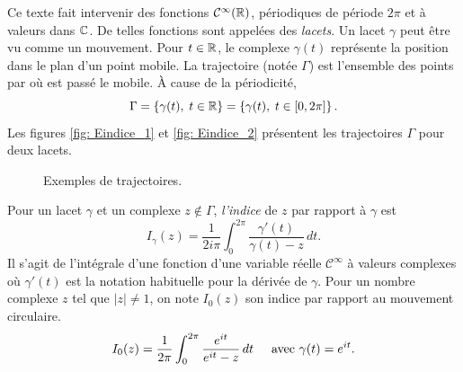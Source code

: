 Ce texte fait intervenir des fonctions $\mathcal{C}^{\infty}(\mathbb{R})$, périodiques de période $2\pi$ et à valeurs dans $\mathbb{C}$. De telles fonctions sont appelées des \emph{lacets}. Un lacet $\gamma$ peut être vu comme un mouvement. Pour $t\in \mathbb{R}$, le complexe $\gamma(t)$ représente la position dans le plan d'un point mobile. La trajectoire (notée $\Gamma$) est l'ensemble des points par où est passé le mobile. \`A cause de la périodicité,
\[
 \Gamma = \left\lbrace \gamma(t), \; t\in \mathbb{R} \right\rbrace = \left\lbrace \gamma(t), \; t\in [0, 2\pi] \right\rbrace .
\]
Les figures \ref{fig: Eindice_1} et \ref{fig: Eindice_2} présentent les trajectoires $\Gamma$ pour deux lacets.
\begin{figure}[h]
  \centering
  \hspace{3cm}
  \caption{Exemples de trajectoires.}
\end{figure}

Pour un lacet $\gamma$ et un complexe $z\notin \Gamma$, \emph{l'indice} de $z$ par rapport à $\gamma$ est 
\[
 I_\gamma (z) = \frac{1}{2 i \pi}\int_{0}^{2\pi}\frac{\gamma'(t)}{\gamma(t) - z} \, dt.
\]
Il s'agit de l'intégrale d'une fonction d'une variable réelle $\mathcal{C}^{\infty}$ à valeurs complexes où $\gamma'(t)$ est la notation habituelle pour la dérivée de $\gamma$. Pour un nombre complexe $z$ tel que $|z|\neq 1$, on note $I_0(z)$ son indice par rapport au mouvement circulaire.
\[
 I_0(z) = \frac{1}{2  \pi}\int_{0}^{2\pi}\frac{ e^{it}}{e^{it} - z} \, dt\hspace{0.5cm} \text{avec } \gamma(t) = e^{it}.
\]

